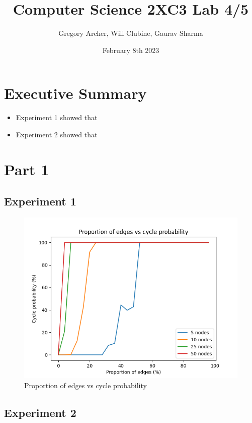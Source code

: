 \documentclass{article}
\title{Computer Science 2XC3 Lab 4/5}
\author{Gregory Archer, Will Clubine, Gaurav Sharma}
\date{February 8th 2023}
\begin{document}
\maketitle

\newpage

\tableofcontents
\listoffigures

\newpage

\section{Executive Summary}
\begin{itemize}
    \item Experiment 1 showed that 
    \item Experiment 2 showed that 
\end{itemize}

\section{Part 1}

\subsection{Experiment 1}

\begin{figure}[H]
    \centering
    \includegraphics[width=0.8\linewidth]{experiment_1.png}
    \caption{Proportion of edges vs cycle probability}
    \label{fig:edges_vs_cycle}
\end{figure}


\subsection{Experiment 2}
\end{document}
